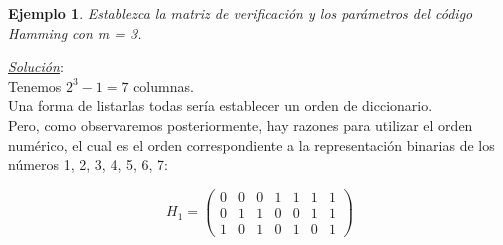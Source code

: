 \documentclass{beamer}
\theoremstyle{plain}
\theoremstyle{example}
\theoremstyle{example}
\newtheorem{ejemplo} [Ejemplo] {Ejemplo}
\begin{document}
\begin{frame}  \small

\begin{ejemplo}
Establezca la matriz de verificación y los parámetros del código Hamming con m = 3.\\
\end{ejemplo}
\textit{\underline{Solución}}:\\
\vspace{0.3cm}
Tenemos $2^3 -1=7$ columnas. \\
\vspace*{5pt}
Una forma de listarlas todas sería establecer un orden de diccionario.\\
\vspace*{5pt}
 Pero, como observaremos posteriormente, hay razones para utilizar el orden numérico, el cual es el orden correspondiente a la representación binarias de los números 1, 2, 3, 4, 5, 6, 7:

\[
    H_1=   \left( \begin{array}{ccccccc}
     				  0 &   0   &   0  &   1 &	1 & 1 & 1\\ 
					  0 &   1   &   1  &   0 &	0 & 1 & 1\\ 
					  1 &   0   &   1  &   0 &	1 & 0 & 1
           			\end{array}
    		\right) 	    		
\]



\end{frame} 
\end{document}
